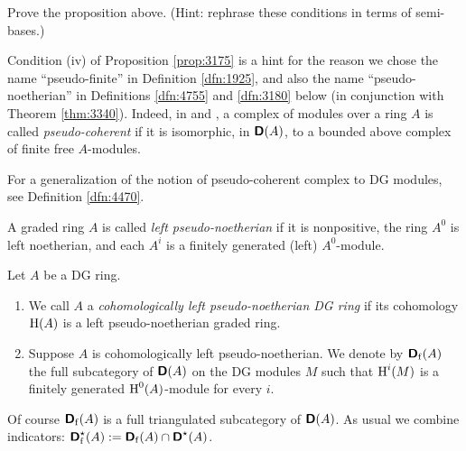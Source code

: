 \begin{exer} \label{exer:3175}
Prove the proposition above. (Hint: rephrase these conditions in terms of  
semi-bases.)
\end{exer}

\begin{rem} \label{rem:4635}
Condition (iv) of Proposition \ref{prop:3175} is a hint for the reason we chose 
the name ``pseudo-finite'' in Definition \ref{dfn:1925}, and also the name 
``pseudo-noetherian'' in Definitions \ref{dfn:4755} and \ref{dfn:3180} below 
(in conjunction with Theorem \ref{thm:3340}). Indeed, in \cite{SGA6} and 
\cite{SP}, a complex of modules over a ring $A$ is called {\em pseudo-coherent} 
if it is isomorphic, in $\boldsymbol{\mathsf{D}}(A)$, to a bounded above complex of finite 
free 
$A$-modules. 

For a generalization of the notion of pseudo-coherent complex to DG modules, 
see 
Definition \ref{dfn:4470}.
\end{rem}

\begin{dfn} \label{dfn:4755} 
A graded ring $A$ is called {\em left pseudo-noetherian} if it is
nonpositive, the ring $A^0$ is left noetherian, and each $A^i$ is a finitely 
generated (left) $A^0$-module. 
\end{dfn}

\begin{dfn} \label{dfn:3180} 
Let $A$ be a DG ring. 
\begin{enumerate}
\item We call $A$ a 
{\em cohomologically left pseudo-noetherian DG ring}%
if its cohomology $\operatorname{H}(A)$ is a left pseudo-noetherian graded ring.

\item Suppose $A$ is cohomologically left pseudo-noetherian. We 
denote by $\boldsymbol{\mathsf{D}}_{\mathrm{f}}(A)$ the full subcategory of 
$\boldsymbol{\mathsf{D}}(A)$ on the DG modules $M$ such that $\operatorname{H}^i(M)$ is a finitely 
generated $\operatorname{H}^0(A)$-module for every $i$. 
\end{enumerate}
\end{dfn}

Of course $\boldsymbol{\mathsf{D}}_{\mathrm{f}}(A)$ is a full triangulated subcategory of 
$\boldsymbol{\mathsf{D}}(A)$. As usual we combine indicators: 
$\boldsymbol{\mathsf{D}}_{\mathrm{f}}^{\star}(A) := \boldsymbol{\mathsf{D}}_{\mathrm{f}}(A) \cap 
\boldsymbol{\mathsf{D}}^{\star}(A)$.

